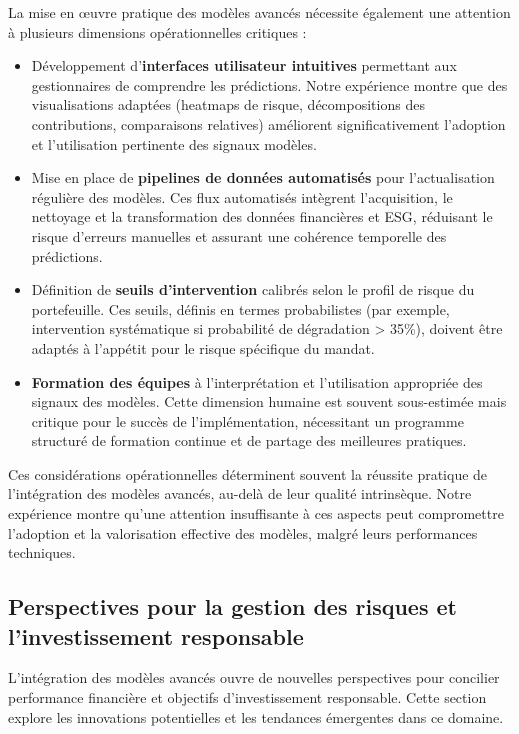 La mise en œuvre pratique des modèles avancés nécessite également une attention à plusieurs dimensions opérationnelles critiques :

\begin{itemize}
    \item Développement d'\textbf{interfaces utilisateur intuitives} permettant aux gestionnaires de comprendre les prédictions. Notre expérience montre que des visualisations adaptées (heatmaps de risque, décompositions des contributions, comparaisons relatives) améliorent significativement l'adoption et l'utilisation pertinente des signaux modèles.
    
    \item Mise en place de \textbf{pipelines de données automatisés} pour l'actualisation régulière des modèles. Ces flux automatisés intègrent l'acquisition, le nettoyage et la transformation des données financières et ESG, réduisant le risque d'erreurs manuelles et assurant une cohérence temporelle des prédictions.
    
    \item Définition de \textbf{seuils d'intervention} calibrés selon le profil de risque du portefeuille. Ces seuils, définis en termes probabilistes (par exemple, intervention systématique si probabilité de dégradation > 35\%), doivent être adaptés à l'appétit pour le risque spécifique du mandat.
    
    \item \textbf{Formation des équipes} à l'interprétation et l'utilisation appropriée des signaux des modèles. Cette dimension humaine est souvent sous-estimée mais critique pour le succès de l'implémentation, nécessitant un programme structuré de formation continue et de partage des meilleures pratiques.
\end{itemize}

Ces considérations opérationnelles déterminent souvent la réussite pratique de l'intégration des modèles avancés, au-delà de leur qualité intrinsèque. Notre expérience montre qu'une attention insuffisante à ces aspects peut compromettre l'adoption et la valorisation effective des modèles, malgré leurs performances techniques.

\subsection{Perspectives pour la gestion des risques et l'investissement responsable}

L'intégration des modèles avancés ouvre de nouvelles perspectives pour concilier performance financière et objectifs d'investissement responsable. Cette section explore les innovations potentielles et les tendances émergentes dans ce domaine.


